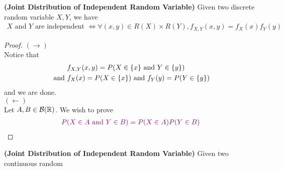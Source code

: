 \documentclass{report}
\begin{document}
\begin{corollary}
\label{3.2.6}
\textbf{(Joint Distribution of Independent Random Variable)} Given two discrete random variable $X,Y$, we have
\begin{align*}
X\text{ and }Y\text{ are independent }\iff \forall (x,y)\in R(X)\times R(Y), f_{X,Y}(x,y)=f_X(x)f_Y(y)
\end{align*}
\end{corollary}
\begin{proof}
$(\longrightarrow)$\\

Notice that 
\begin{align*}
&f_{X,Y}(x,y)=P(X\in \{ x \}\text{ and }Y\in \{ y \})\\
\text{ and }&f_{X}(x)=P(X\in \{ x \})\text{ and }f_Y(y)=P(Y\in \{ y \})
\end{align*}
and we are done.\\

$(\longleftarrow)$\\

Let $A,B\in \mathcal{B}(\mathbb{R})$. We wish to prove 
\begin{align*}
\textcolor{violet}{P(X\in A\text{ and }Y\in B)=P(X\in A)P(Y\in B)}
\end{align*}

\end{proof}
\begin{corollary}
\label{3.2.7}
\textbf{(Joint Distribution of Independent Random Variable)} Given two continuous random 
\end{corollary}
\end{document}
